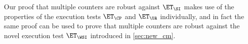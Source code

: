 {Our proof that multiple counters are robust against $\ET_{\SI}$ makes use 
of the properties of the execution tests $\ET_{\CP}$ and $\ET_{\UA}$ individually, and in fact the same proof can 
be used to prove that multiple counters are robust against the novel execution test $\ET_{\WSI}$ 
introduced in \cref{sec:new_cm}. 

}

